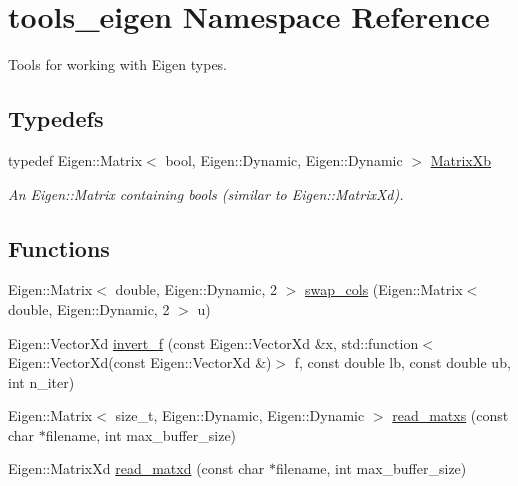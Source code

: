 \hypertarget{namespacetools__eigen}{}\section{tools\+\_\+eigen Namespace Reference}
\label{namespacetools__eigen}


Tools for working with Eigen types.  


\subsection*{Typedefs}
\begin{DoxyCompactItemize}
\item 
typedef Eigen\+::\+Matrix$<$ bool, Eigen\+::\+Dynamic, Eigen\+::\+Dynamic $>$ \hyperlink{namespacetools__eigen_ad496806a2d02c8e881330d95e0c150aa}{Matrix\+Xb}\hypertarget{namespacetools__eigen_ad496806a2d02c8e881330d95e0c150aa}{}\label{namespacetools__eigen_ad496806a2d02c8e881330d95e0c150aa}

\begin{DoxyCompactList}\small\item\em An {\ttfamily Eigen\+::\+Matrix} containing {\ttfamily bool}s (similar to {\ttfamily Eigen\+::\+Matrix\+Xd}). \end{DoxyCompactList}\end{DoxyCompactItemize}
\subsection*{Functions}
\begin{DoxyCompactItemize}
\item 
Eigen\+::\+Matrix$<$ double, Eigen\+::\+Dynamic, 2 $>$ \hyperlink{namespacetools__eigen_a5ec97cf8c69d2dd29c7d60fc5554bac0}{swap\+\_\+cols} (Eigen\+::\+Matrix$<$ double, Eigen\+::\+Dynamic, 2 $>$ u)
\item 
Eigen\+::\+Vector\+Xd \hyperlink{namespacetools__eigen_ad9c98ebe3d1a6722dc31aae311e62be0}{invert\+\_\+f} (const Eigen\+::\+Vector\+Xd \&x, std\+::function$<$ Eigen\+::\+Vector\+Xd(const Eigen\+::\+Vector\+Xd \&)$>$ f, const double lb, const double ub, int n\+\_\+iter)
\item 
Eigen\+::\+Matrix$<$ size\+\_\+t, Eigen\+::\+Dynamic, Eigen\+::\+Dynamic $>$ \hyperlink{namespacetools__eigen_ab0621335fea3d0f9ebff30dd5bb1326d}{read\+\_\+matxs} (const char $\ast$filename, int max\+\_\+buffer\+\_\+size)
\item 
Eigen\+::\+Matrix\+Xd \hyperlink{namespacetools__eigen_a37c4357e7ae885e9e4d80e0242f4854e}{read\+\_\+matxd} (const char $\ast$filename, int max\+\_\+buffer\+\_\+size)
\end{DoxyCompactItemize}


